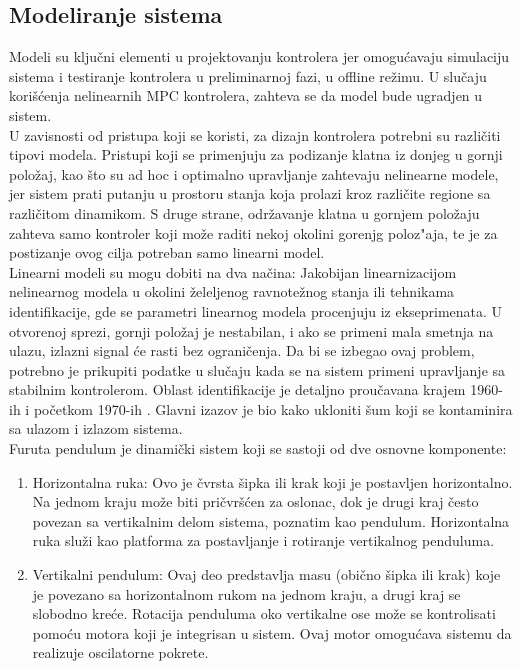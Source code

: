 \documentclass[a4paper,11pt]{article}
\theoremstyle{definition} \newtheorem{deff}{Definicija}[section]
\theoremstyle{definition} \newtheorem{prim}[deff]{Primer}
\theoremstyle{plain} \newtheorem{teor}[deff]{Teorema}
\begin{document}
	\newpage
	
	\subsection{Modeliranje sistema} 
	
	Modeli su ključni elementi u projektovanju kontrolera jer omogućavaju simulaciju sistema i testiranje kontrolera u preliminarnoj fazi, u offline režimu. U slučaju korišćenja nelinearnih MPC kontrolera, zahteva se da model bude ugradjen u sistem.  \\
	
	U zavisnosti od pristupa koji se koristi, za dizajn kontrolera potrebni su različiti tipovi modela. Pristupi koji se primenjuju za podizanje klatna iz donjeg u gornji položaj, kao što su ad hoc i optimalno upravljanje zahtevaju nelinearne modele, jer sistem prati putanju u prostoru stanja koja prolazi kroz različite regione sa različitom dinamikom. S druge strane, održavanje klatna u gornjem položaju zahteva samo kontroler koji može raditi nekoj okolini gorenjg poloz"aja, te je za postizanje ovog cilja potreban samo linearni model.  \\
	
	Linearni modeli su mogu dobiti na dva načina: Jakobijan linearnizacijom nelinearnog modela u okolini želeljenog ravnotežnog stanja ili tehnikama identifikacije, gde se parametri linearnog modela procenjuju iz ekseprimenata. U otvorenoj sprezi, gornji položaj je nestabilan, i ako se primeni mala smetnja na ulazu, izlazni signal će rasti bez ograničenja. Da bi se izbegao ovaj problem, potrebno je prikupiti podatke u slučaju kada se na sistem primeni upravljanje sa stabilnim kontrolerom.  Oblast identifikacije je detaljno proučavana krajem 1960-ih i početkom 1970-ih  \cite{identifikacija}. Glavni izazov je bio kako ukloniti šum koji se kontaminira sa ulazom i izlazom sistema.  \\
	
	
	Furuta pendulum je dinamički sistem koji se sastoji od dve osnovne komponente: \\
	
	\begin{enumerate}
		\item Horizontalna ruka: Ovo je čvrsta šipka ili krak koji je postavljen horizontalno. Na jednom kraju može biti pričvršćen za oslonac, dok je drugi kraj često povezan sa vertikalnim delom sistema, poznatim kao pendulum. Horizontalna ruka služi kao platforma za postavljanje i rotiranje vertikalnog penduluma. \\
		
		\item Vertikalni pendulum: Ovaj deo predstavlja masu (obično šipka ili krak) koje je povezano sa horizontalnom rukom na jednom kraju, a drugi kraj se slobodno kreće. Rotacija penduluma oko vertikalne ose može se kontrolisati pomoću motora koji je integrisan u sistem. Ovaj motor omogućava sistemu da realizuje oscilatorne pokrete.\\
		
	\end{enumerate}
	
\end{document}
